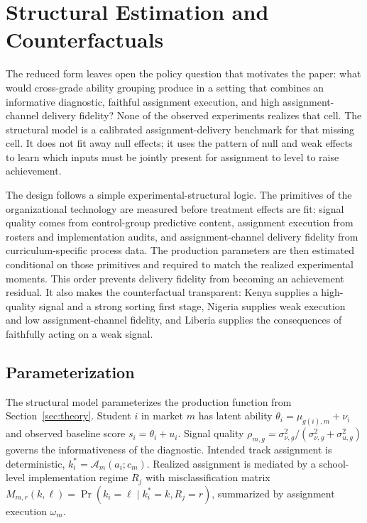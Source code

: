 \documentclass[11pt]{article}
\begin{document}
\section{Structural Estimation and Counterfactuals}
\label{sec:structural}

The reduced form leaves open the policy question that motivates the paper: what would cross-grade ability grouping produce in a setting that combines an informative diagnostic, faithful assignment execution, and high assignment-channel delivery fidelity? None of the observed experiments realizes that cell. The structural model is a calibrated assignment-delivery benchmark for that missing cell. It does not fit away null effects; it uses the pattern of null and weak effects to learn which inputs must be jointly present for assignment to level to raise achievement.

The design follows a simple experimental-structural logic. The primitives of the organizational technology are measured before treatment effects are fit: signal quality comes from control-group predictive content, assignment execution from rosters and implementation audits, and assignment-channel delivery fidelity from curriculum-specific process data. The production parameters are then estimated conditional on those primitives and required to match the realized experimental moments. This order prevents delivery fidelity from becoming an achievement residual. It also makes the counterfactual transparent: Kenya supplies a high-quality signal and a strong sorting first stage, Nigeria supplies weak execution and low assignment-channel fidelity, and Liberia supplies the consequences of faithfully acting on a weak signal.

\subsection{Parameterization}
\label{subsec:struct_param}

The structural model parameterizes the production function from Section~\ref{sec:theory}. Student $i$ in market $m$ has latent ability $\theta_i = \mu_{g(i),m} + \nu_i$ and observed baseline score $s_i = \theta_i + u_i$. Signal quality $\rho_{m,g} = \sigma^2_{\nu,g}/(\sigma^2_{\nu,g} + \sigma^2_{u,g})$ governs the informativeness of the diagnostic. Intended track assignment is deterministic, $k_i^* = \mathcal{A}_m(a_i; c_m)$. Realized assignment is mediated by a school-level implementation regime $R_j$ with misclassification matrix $M_{m,r}(k,\ell) = \Pr(k_i = \ell \mid k_i^* = k, R_j = r)$, summarized by assignment execution $\omega_m$.
\end{document}
